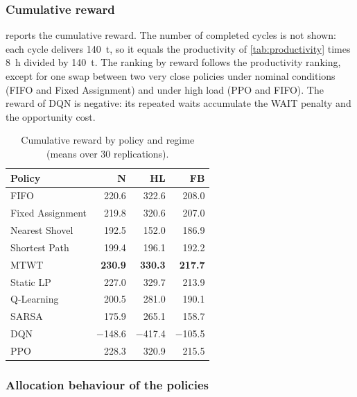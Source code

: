 \documentclass[11pt,a4paper]{article}
\newif\ifrevmarks
\newcommand{\revtag}[1]{\ifrevmarks\textsuperscript{\textcolor{red!70!black}{\scriptsize[#1]}}\fi}
\newenvironment{revbloc}[1]{\par\ifrevmarks\color{revcolor}\noindent\revtag{#1}\ \fi}{\par}
\newif\ifcorrmarks
\newcommand{\corr}[1]{\ifcorrmarks\textcolor{corrcolor}{#1}\else#1\fi}
\begin{document}
\subsubsection{\corr{Cumulative reward}}
\label{sec:reward-results}
\begin{revbloc}{T31}
 reports the cumulative reward. \corr{The number of completed cycles is not shown: each cycle delivers 140~t, so it equals the productivity of \cref{tab:productivity} times 8~h divided by 140~t.} The ranking by reward follows the productivity ranking, except for one swap between two very close policies under nominal conditions (FIFO and Fixed Assignment) and under high load (PPO and FIFO). The reward of DQN is negative: its repeated waits accumulate the WAIT penalty and the opportunity cost.

\begin{table}[H]
\centering
\caption{\corr{Cumulative reward by policy and regime (means over 30 replications).}}
\label{tab:cycles_reward}
\small
\begin{tabular}{@{}lrrr@{}}
\toprule
\textbf{Policy} & \textbf{N} & \textbf{HL} & \textbf{FB} \\
\midrule
FIFO                   & 220.6 & 322.6 & 208.0 \\
Fixed Assignment       & 219.8 & 320.6 & 207.0 \\
Nearest Shovel         & 192.5 & 152.0 & 186.9 \\
Shortest Path          & 199.4 & 196.1 & 192.2 \\
MTWT                   & \textbf{230.9} & \textbf{330.3} & \textbf{217.7} \\
\corr{Static LP}       & 227.0 & 329.7 & 213.9 \\
\midrule
Q-Learning             & 200.5 & 281.0 & 190.1 \\
SARSA                  & 175.9 & 265.1 & 158.7 \\
DQN                    & $-$148.6 & $-$417.4 & $-$105.5 \\
PPO                    & 228.3 & 320.9 & 215.5 \\
\bottomrule
\end{tabular}
\end{table}
\end{revbloc}

\subsubsection{Allocation behaviour of the policies}
\label{sec:behaviour}
\end{document}
